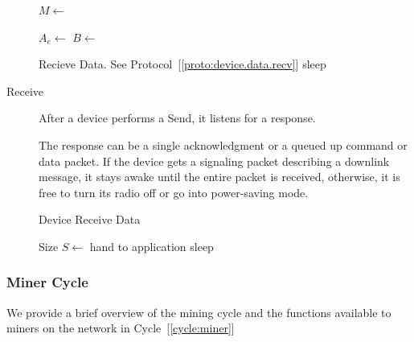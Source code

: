 \documentclass[10pt, nonatbib, nocopyrightspace, reprint]{sigplanconf}
\begin{document}
\begin{description}
\begin{algorithm}[!htb]
       {
        $M \leftarrow $  \;
         \;
        \BlankLine

        $A_e \leftarrow $  \;
        $B \leftarrow $  \;
         \;
        \BlankLine

         {
           {
            Recieve Data. See Protocol~[\ref{proto:device.data.recv}]
          }
           {sleep}
        }
      }
    \end{algorithm}
    \FloatBarrier

  \item [Receive] After a device performs a Send, it listens for a response.

    The response can be a single acknowledgment or a queued up command or data packet. If the device gets a signaling packet describing a downlink message, it stays awake until the entire packet is received, otherwise, it is free to turn its radio off or go into power-saving mode.

    \begin{algorithm}[!htb]
      \DontPrintSemicolon
      \caption{Device Receive Data}\label{proto:device.data.recv}

       {
        Size $S \leftarrow $  \;
         {
           {hand to application}
           {sleep}
        }
      }
    \end{algorithm}
    \FloatBarrier

\end{description}


\subsubsection{Miner Cycle}\label{mining}

We provide a brief overview of the mining cycle and the functions available to miners on the network in Cycle~[\ref{cycle:miner}]
\end{document}
